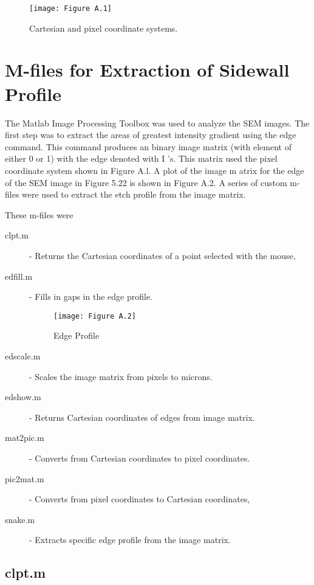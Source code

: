 \begin{figure}[H]
	\centering
	\texttt{[image: Figure A.1]}
	\bf\caption{ Cartesian and pixel coordinate systems.}
	\label{fig:A.1}
\end{figure}

\section{M-files for Extraction of Sidewall Profile}

\tab The Matlab Image Processing Toolbox was used to analyze the SEM images. The first
step was to extract the areas of greatest intensity gradient using the edge command. This
command produces an binary image matrix (with element of either 0 or 1) with the edge
denoted with I ’s. This matrix used the pixel coordinate system shown in Figure A.l. A
plot of the image m atrix for the edge of the SEM image in Figure 5.22 is shown in Figure
A.2. A series of custom m-files were used to extract the etch profile from the image matrix. 

These m-files were

\begin{description}
	\item[clpt.m] - Returns the Cartesian coordinates of a point selected with the mouse,
	\item[edfill.m] - Fills in gaps in the edge profile.
	
	\begin{figure}[H]
		\centering
		\texttt{[image: Figure A.2]}
		\bf\caption{Edge Profile}
		\label{fig:A.2}
	\end{figure}
	
	\item[edscale.m] - Scales the image matrix from pixels to microns.
	\item[edshow.m] - Returns Cartesian coordinates of edges from image matrix.
	\item[mat2pic.m] - Converts from Cartesian coordinates to pixel coordinates.
	\item[pic2mat.m] - Converts from pixel coordinates to Cartesian coordinates,
	\item[snake.m] - Extracts specific edge profile from the image matrix.
\end{description}

\subsection{clpt.m}


